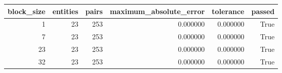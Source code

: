 \begin{tabular}{rrrrrr}
\toprule
block_size & entities & pairs & maximum_absolute_error & tolerance & passed \\
\midrule
1 & 23 & 253 & 0.000000 & 0.000000 & True \\
7 & 23 & 253 & 0.000000 & 0.000000 & True \\
23 & 23 & 253 & 0.000000 & 0.000000 & True \\
32 & 23 & 253 & 0.000000 & 0.000000 & True \\
\bottomrule
\end{tabular}
